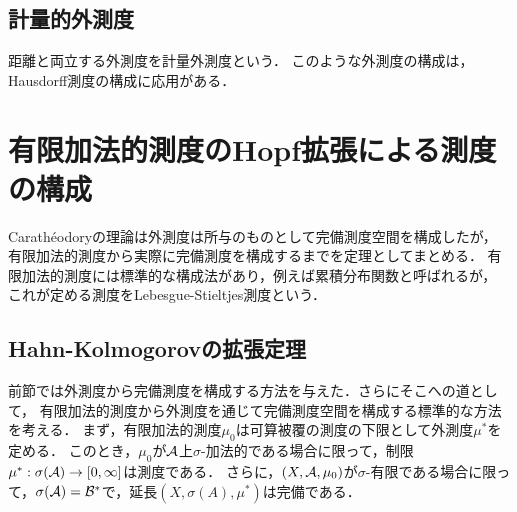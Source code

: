 \documentclass[uplatex, dvipdfmx]{jsreport}
\begin{document}
\subsection{計量的外測度}

\begin{tcolorbox}[colframe=ForestGreen, colback=ForestGreen!10!white,breakable,colbacktitle=ForestGreen!40!white,coltitle=black,fonttitle=\bfseries\sffamily,
title=]
    距離と両立する外測度を計量外測度という．
    このような外測度の構成は，Hausdorff測度の構成に応用がある．
\end{tcolorbox}

\section{有限加法的測度のHopf拡張による測度の構成}

\begin{tcolorbox}[colframe=ForestGreen, colback=ForestGreen!10!white,breakable,colbacktitle=ForestGreen!40!white,coltitle=black,fonttitle=\bfseries\sffamily,
title=]
    Carathéodoryの理論は外測度は所与のものとして完備測度空間を構成したが，
    有限加法的測度から実際に完備測度を構成するまでを定理としてまとめる．
    有限加法的測度には標準的な構成法があり，例えば累積分布関数と呼ばれるが，
    これが定める測度をLebesgue-Stieltjes測度という．
\end{tcolorbox}

\subsection{Hahn-Kolmogorovの拡張定理}

\begin{tcolorbox}[colframe=ForestGreen, colback=ForestGreen!10!white,breakable,colbacktitle=ForestGreen!40!white,coltitle=black,fonttitle=\bfseries\sffamily,
title=Hahn-Kolmogorovの拡張定理]
    前節では外測度から完備測度を構成する方法を与えた．さらにそこへの道として，
    有限加法的測度から外測度を通じて完備測度空間を構成する標準的な方法を考える．
    まず，有限加法的測度$\mu_0$は可算被覆の測度の下限として外測度$\mu^*$を定める．
    このとき，$\mu_0$が$\mathcal{A}$上$\sigma$-加法的である場合に限って，制限$\mu^*:\sigma(\mathcal{A})\to[0,\infty]$は測度である．
    さらに，$(X,\mathcal{A},\mu_0)$が$\sigma$-有限である場合に限って，$\sigma(\mathcal{A})=\mathcal{B}^*$で，延長$(X,\sigma(A),\mu^*)$は完備である．
\end{tcolorbox}
\end{document}
